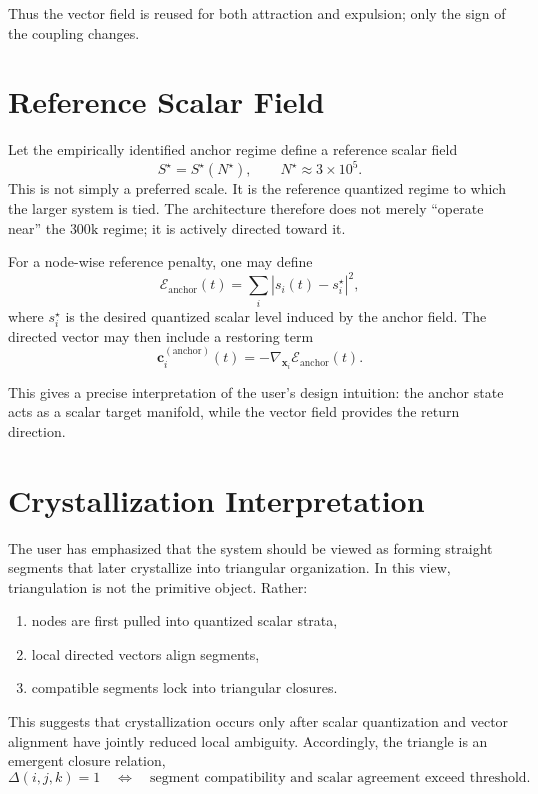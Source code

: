 \documentclass[11pt,a4paper]{article}
\begin{document}
Thus the vector field is reused for both attraction and expulsion; only the
sign of the coupling changes.

\section{Reference Scalar Field}
Let the empirically identified anchor regime define a reference scalar field
\[
S^\star = S^\star(N^\star), \qquad N^\star \approx 3 \times 10^5.
\]
This is not simply a preferred scale. It is the reference quantized regime to
which the larger system is tied. The architecture therefore does not merely
``operate near'' the $300\mathrm{k}$ regime; it is actively directed toward it.

For a node-wise reference penalty, one may define
\[
\mathcal{E}_{\mathrm{anchor}}(t)
=
\sum_i
\left|
s_i(t) - s_i^\star
\right|^2,
\]
where $s_i^\star$ is the desired quantized scalar level induced by the anchor
field. The directed vector may then include a restoring term
\[
\mathbf{c}_i^{(\mathrm{anchor})}(t)
=
-
\nabla_{\mathbf{x}_i}
\mathcal{E}_{\mathrm{anchor}}(t).
\]

This gives a precise interpretation of the user's design intuition: the anchor
state acts as a scalar target manifold, while the vector field provides the
return direction.

\section{Crystallization Interpretation}
The user has emphasized that the system should be viewed as forming straight
segments that later crystallize into triangular organization. In this view,
triangulation is not the primitive object. Rather:
\begin{enumerate}[label=\arabic*.]
    \item nodes are first pulled into quantized scalar strata,
    \item local directed vectors align segments,
    \item compatible segments lock into triangular closures.
\end{enumerate}

This suggests that crystallization occurs only after scalar quantization and
vector alignment have jointly reduced local ambiguity. Accordingly, the
triangle is an emergent closure relation,
\[
\Delta(i,j,k)
=
1
\quad \Longleftrightarrow \quad
\text{segment compatibility and scalar agreement exceed threshold.}
\]
\end{document}
